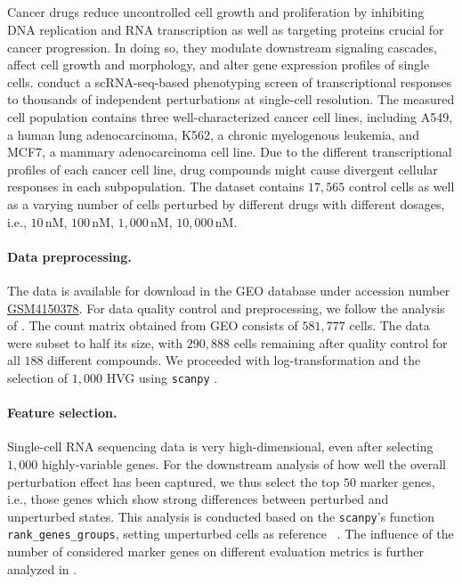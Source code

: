 \subsection{\citet{srivatsan2020massively}}
\label{app:dataset_srivatsan}

 Cancer drugs reduce uncontrolled cell growth and proliferation by inhibiting DNA replication and RNA transcription as well as targeting proteins crucial for cancer progression. In doing so, they modulate downstream signaling cascades, affect cell growth and morphology, and alter gene expression profiles of single cells. 
\citet{srivatsan2020massively} conduct a scRNA-seq-based phenotyping screen of transcriptional responses to thousands of independent perturbations at single-cell resolution.
The measured cell population contains three well-characterized cancer cell lines, including A549, a human lung adenocarcinoma, K562, a chronic myelogenous leukemia, and MCF7, a mammary adenocarcinoma cell line.
Due to the different transcriptional profiles of each cancer cell line, drug compounds might cause divergent cellular responses in each subpopulation.
The dataset contains $17,565$ control cells as well as a varying number of cells perturbed by different drugs with different dosages, i.e., $10\,$nM, $100\,$nM, $1,000\,$nM, $10,000\,$nM.

\paragraph{Data preprocessing.}
The data is available for download in the \acrfull{GEO} database under accession number \href{https://www.ncbi.nlm.nih.gov/geo/query/acc.cgi?acc=GSM4150378}{GSM4150378}.
For data quality control and preprocessing, we follow the analysis of \citet{lotfollahi2021compositional}. The count matrix obtained from GEO consists of $581,777$ cells. The data were subset to half its size, with $290,888$ cells remaining after quality control for all $188$ different compounds. We proceeded with log-transformation and the selection of $1,000$ \acrfull{HVG} using \texttt{scanpy} \citep{wolf2018scanpy}.

\paragraph{Feature selection.}
Single-cell RNA sequencing data is very high-dimensional, even after selecting $1,000$ highly-variable genes.
For the downstream analysis of how well the overall perturbation effect has been captured, we thus select the top $50$ marker genes, i.e., those genes which show strong differences between perturbed and unperturbed states. This analysis is conducted based on the \texttt{scanpy}'s function \texttt{rank\_genes\_groups}, setting unperturbed cells as reference ~\citep{wolf2018scanpy}. The influence of the number of considered marker genes on different evaluation metrics is further analyzed in \citet{bunne2021learning}.

